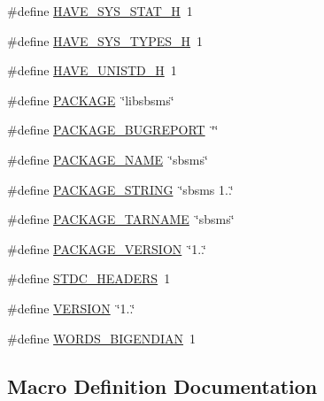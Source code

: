 \begin{DoxyCompactItemize}
\item 
\#define \hyperlink{lib-src_2sbsms_2win_2config_8h_ace156430ba007d19b4348a950d0c692b}{H\+A\+V\+E\+\_\+\+S\+Y\+S\+\_\+\+S\+T\+A\+T\+\_\+H}~1
\item 
\#define \hyperlink{lib-src_2sbsms_2win_2config_8h_a69dc70bea5d1f8bd2be9740e974fa666}{H\+A\+V\+E\+\_\+\+S\+Y\+S\+\_\+\+T\+Y\+P\+E\+S\+\_\+H}~1
\item 
\#define \hyperlink{lib-src_2sbsms_2win_2config_8h_a219b06937831d0da94d801ab13987639}{H\+A\+V\+E\+\_\+\+U\+N\+I\+S\+T\+D\+\_\+H}~1
\item 
\#define \hyperlink{lib-src_2sbsms_2win_2config_8h_aca8570fb706c81df371b7f9bc454ae03}{P\+A\+C\+K\+A\+GE}~\char`\"{}libsbsms\char`\"{}
\item 
\#define \hyperlink{lib-src_2sbsms_2win_2config_8h_a1d1d2d7f8d2f95b376954d649ab03233}{P\+A\+C\+K\+A\+G\+E\+\_\+\+B\+U\+G\+R\+E\+P\+O\+RT}~\char`\"{}\char`\"{}
\item 
\#define \hyperlink{lib-src_2sbsms_2win_2config_8h_a1c0439e4355794c09b64274849eb0279}{P\+A\+C\+K\+A\+G\+E\+\_\+\+N\+A\+ME}~\char`\"{}sbsms\char`\"{}
\item 
\#define \hyperlink{lib-src_2sbsms_2win_2config_8h_ac73e6f903c16eca7710f92e36e1c6fbf}{P\+A\+C\+K\+A\+G\+E\+\_\+\+S\+T\+R\+I\+NG}~\char`\"{}sbsms 1..\char`\"{}
\item 
\#define \hyperlink{lib-src_2sbsms_2win_2config_8h_af415af6bfede0e8d5453708afe68651c}{P\+A\+C\+K\+A\+G\+E\+\_\+\+T\+A\+R\+N\+A\+ME}~\char`\"{}sbsms\char`\"{}
\item 
\#define \hyperlink{lib-src_2sbsms_2win_2config_8h_aa326a05d5e30f9e9a4bb0b4469d5d0c0}{P\+A\+C\+K\+A\+G\+E\+\_\+\+V\+E\+R\+S\+I\+ON}~\char`\"{}1..\char`\"{}
\item 
\#define \hyperlink{lib-src_2sbsms_2win_2config_8h_a550e5c272cc3cf3814651721167dcd23}{S\+T\+D\+C\+\_\+\+H\+E\+A\+D\+E\+RS}~1
\item 
\#define \hyperlink{lib-src_2sbsms_2win_2config_8h_a1c6d5de492ac61ad29aec7aa9a436bbf}{V\+E\+R\+S\+I\+ON}~\char`\"{}1..\char`\"{}
\item 
\#define \hyperlink{lib-src_2sbsms_2win_2config_8h_a82e69009d3cd108c8aad8afe44fb1132}{W\+O\+R\+D\+S\+\_\+\+B\+I\+G\+E\+N\+D\+I\+AN}~1
\end{DoxyCompactItemize}


\subsection{Macro Definition Documentation}
